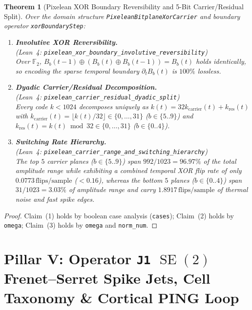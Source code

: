\documentclass[11pt,letterpaper]{article}
\newcommand{\lean}[1]{\nolinkurl{#1}}
\newtheorem{theorem}{Theorem}[section]
\theoremstyle{definition}
\begin{document}
\begin{theorem}[Pixelean XOR Boundary Reversibility and 5-Bit Carrier/Residual Split]\label{thm:pillar4}
Over the domain structure \lean{PixeleanBitplaneXorCarrier} and boundary operator \lean{xorBoundaryStep}:
\begin{enumerate}
  \item \textbf{Involutive XOR Reversibility.}\\
  (\emph{Lean~4:} \lean{pixelean_xor_boundary_involutive_reversibility})\\
  Over $\mathbb{F}_2$, $B_b(t-1) \oplus (B_b(t) \oplus B_b(t-1)) = B_b(t)$ holds identically, so encoding the sparse temporal boundary $\partial_t B_b(t)$ is $100\%$ lossless.
  \item \textbf{Dyadic Carrier/Residual Decomposition.}\\
  (\emph{Lean~4:} \lean{pixelean_carrier_residual_dyadic_split})\\
  Every code $k < 1024$ decomposes uniquely as $k(t) = 32 k_{\mathrm{carrier}}(t) + k_{\mathrm{res}}(t)$ with $k_{\mathrm{carrier}}(t) = \lfloor k(t)/32 \rfloor \in \{0,\dots,31\}$ ($b \in \{5..9\}$) and $k_{\mathrm{res}}(t) = k(t) \bmod 32 \in \{0,\dots,31\}$ ($b \in \{0..4\}$).
  \item \textbf{Switching Rate Hierarchy.}\\
  (\emph{Lean~4:} \lean{pixelean_carrier_range_and_switching_hierarchy})\\
  The top $5$ carrier planes ($b \in \{5..9\}$) span $992 / 1023 = 96.97\%$ of the total amplitude range while exhibiting a combined temporal XOR flip rate of only $0.0773\,\text{flips/sample}$ ($< 0.16$), whereas the bottom $5$ planes ($b \in \{0..4\}$) span $31 / 1023 = 3.03\%$ of amplitude range and carry $1.8917\,\text{flips/sample}$ of thermal noise and fast spike edges.
\end{enumerate}
\end{theorem}
\begin{proof}
Claim~(1) holds by boolean case analysis (\texttt{cases}); Claim~(2) holds by \texttt{omega}; Claim~(3) holds by \texttt{omega} and \texttt{norm\_num}.
\end{proof}

\section[Pillar V: Operator J1 SE(2) Spike Jets \& Cortical PING Loop]{Pillar V: Operator \texttt{J1} $\operatorname{SE}(2)$ Frenet--Serret Spike Jets, Cell Taxonomy \& Cortical PING Loop}
\end{document}
